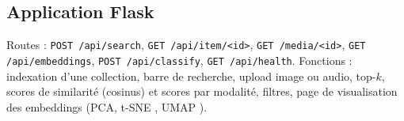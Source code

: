 \subsection{Application Flask}
Routes : \texttt{POST /api/search}, \texttt{GET /api/item/<id>}, \texttt{GET /media/<id>}, \texttt{GET /api/embeddings},
\texttt{POST /api/classify}, \texttt{GET /api/health}. Fonctions : indexation d'une collection, barre de recherche, upload
image ou audio, top-$k$, scores de similarité (cosinus) et scores par modalité, filtres, page de visualisation des embeddings
(PCA, t-SNE \cite{vandermaaten2008tsne}, UMAP \cite{mcinnes2018umap}).
